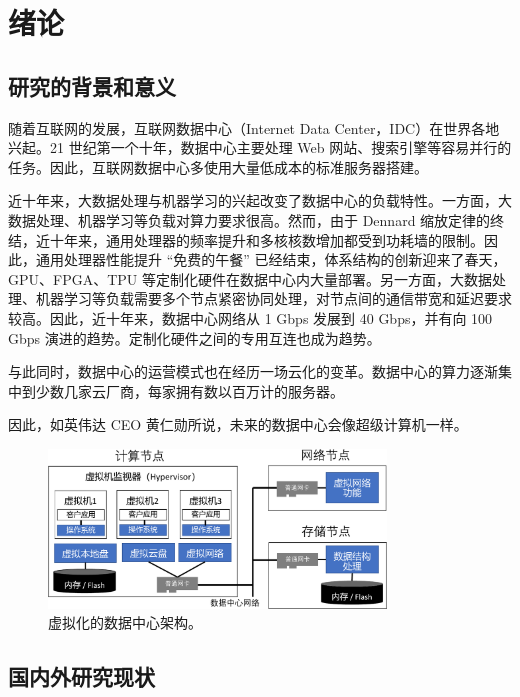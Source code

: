 \chapter{绪论}

\section{研究的背景和意义}

随着互联网的发展，互联网数据中心（Internet Data Center，IDC）在世界各地兴起。21 世纪第一个十年，数据中心主要处理 Web 网站、搜索引擎等容易并行的任务。因此，互联网数据中心多使用大量低成本的标准服务器搭建。

近十年来，大数据处理与机器学习的兴起改变了数据中心的负载特性。一方面，大数据处理、机器学习等负载对算力要求很高。然而，由于 Dennard 缩放定律的终结，近十年来，通用处理器的频率提升和多核核数增加都受到功耗墙的限制。因此，通用处理器性能提升 ``免费的午餐'' 已经结束，体系结构的创新迎来了春天，GPU、FPGA、TPU 等定制化硬件在数据中心内大量部署。另一方面，大数据处理、机器学习等负载需要多个节点紧密协同处理，对节点间的通信带宽和延迟要求较高。因此，近十年来，数据中心网络从 1 Gbps 发展到 40 Gbps，并有向 100 Gbps 演进的趋势。定制化硬件之间的专用互连也成为趋势。

与此同时，数据中心的运营模式也在经历一场云化的变革。数据中心的算力逐渐集中到少数几家云厂商，每家拥有数以百万计的服务器。

因此，如英伟达 CEO 黄仁勋所说，未来的数据中心会像超级计算机一样。




\begin{figure}[htbp]
	\centering
	\includegraphics[width=0.8\textwidth]{figures/virt_arch.pdf}
	\caption{虚拟化的数据中心架构。}
	\label{background:fig:virt-architecture}
\end{figure}

\section{国内外研究现状}




